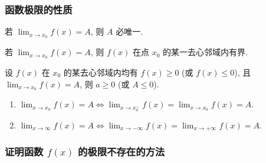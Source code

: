 \subsubsection{函数极限的性质}

\begin{theorem}[函数极限的唯一性]
    若 $\displaystyle\lim_{x\to x_0}f(x)=A$, 则 $A$ 必唯一.
\end{theorem}

\begin{theorem}[函数极限的有界性]
    若 $\displaystyle\lim_{x\to x_0}f(x)=A$, 则 $f(x)$ 在点 $x_0$ 的某一去心邻域内有界.
\end{theorem}

\begin{theorem}[函数极限的保号性]
    设 $f(x)$ 在 $x_0$ 的某去心邻域内均有 $f(x)\geqslant 0$ (或 $f(x)\leqslant 0$), 且 $\displaystyle\lim_{x\to x_0}f(x)=A$, 则 $a\geqslant 0$ (或 $A\leqslant 0$).
\end{theorem}

\begin{theorem}[函数极限的充要条件]
    \begin{enumerate}[label=(\arabic{*})]
        \item $\displaystyle\lim _{x \rightarrow x_{0}} f(x)=A \Leftrightarrow \lim _{x \rightarrow x_{0}^{-}} f(x)=\lim _{x \rightarrow x_{0}} f(x)=A $.
        \item $\displaystyle\lim _{x \rightarrow \infty} f(x)=A \Leftrightarrow \lim _{x \rightarrow-\infty} f(x)=\lim _{x \rightarrow+\infty} f(x)=A .$
    \end{enumerate}
\end{theorem}

\subsubsection{证明函数 $ f(x) $ 的极限不存在的方法}

